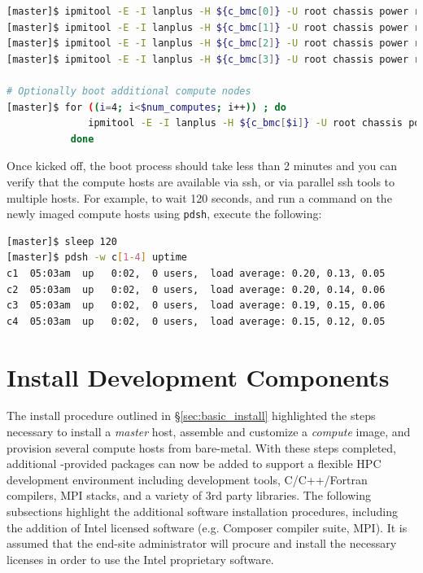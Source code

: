 \documentclass[letterpaper]{article}
\begin{document}

\begin{lstlisting}[language=bash,keywords={},upquote=true]
[master]$ ipmitool -E -I lanplus -H ${c_bmc[0]} -U root chassis power reset   # power cycle c1
[master]$ ipmitool -E -I lanplus -H ${c_bmc[1]} -U root chassis power reset   # power cycle c2
[master]$ ipmitool -E -I lanplus -H ${c_bmc[2]} -U root chassis power reset   # power cycle c3
[master]$ ipmitool -E -I lanplus -H ${c_bmc[3]} -U root chassis power reset   # power cycle c4

# Optionally boot additional compute nodes
[master]$ for ((i=4; i<$num_computes; i++)) ; do
              ipmitool -E -I lanplus -H ${c_bmc[$i]} -U root chassis power reset
           done
\end{lstlisting} 

Once kicked off, the boot process should take less than 2 minutes and you can
verify that the compute hosts are available via ssh, or via parallel ssh tools to multiple
hosts. For example, to wait 120 seconds, and run a command on the newly imaged
compute hosts using \texttt{pdsh}, execute the following:

\begin{lstlisting}[language=bash]
[master]$ sleep 120
[master]$ pdsh -w c[1-4] uptime
c1  05:03am  up   0:02,  0 users,  load average: 0.20, 0.13, 0.05
c2  05:03am  up   0:02,  0 users,  load average: 0.20, 0.14, 0.06
c3  05:03am  up   0:02,  0 users,  load average: 0.19, 0.15, 0.06
c4  05:03am  up   0:02,  0 users,  load average: 0.15, 0.12, 0.05
\end{lstlisting}



\section{Install \FSP{} Development Components}

The install procedure outlined in \S\ref{sec:basic_install}
highlighted the steps necessary to install a {\em master} host,
assemble and customize a {\em compute} image, and provision several
compute hosts from bare-metal.  With these steps completed, 
additional \FSP{}-provided packages can now be added to support a flexible HPC
development environment including development tools, C/C++/Fortran compilers,
MPI stacks, and a variety of 3rd party libraries. The following subsections
highlight the additional software installation procedures, including the
addition of Intel licensed software (e.g. Composer compiler suite, \Intel{}
MPI). It is assumed that the end-site administrator will procure and install
the necessary licenses in order to use the Intel proprietary software.
\end{document}
